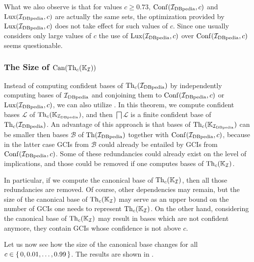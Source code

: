 What we also observe is that for values $c \geq 0.73$, $\operatorname{Conf}({\mathcal{I}_{\text{DBpedia}}}, c)$ and
$\operatorname{Lux}({\mathcal{I}_{\text{DBpedia}}}, c)$ are actually the same sets, \ie the optimization provided by
$\operatorname{Lux}({\mathcal{I}_{\text{DBpedia}}}, c)$ does not take effect for such values of $c$.  Since one usually
considers only large values of $c$ the use of $\operatorname{Lux}({\mathcal{I}_{\text{DBpedia}}}, c)$ over $\operatorname{Conf}({\mathcal{I}_{\text{DBpedia}}},
c)$ seems questionable.

\subsubsection{The Size of $\operatorname{Can}(\operatorname{Th}_c({\mathbb{K}}_{\mathcal{I}}))$}
\label{sec:size-canth_cc-k_math}

Instead of computing confident bases of $\operatorname{Th}_c({\mathcal{I}_{\text{DBpedia}}})$ by independently computing
bases of ${\mathcal{I}_{\text{DBpedia}}}$ and conjoining them to $\operatorname{Conf}({\mathcal{I}_{\text{DBpedia}}}, c)$ or $\operatorname{Lux}({\mathcal{I}_{\text{DBpedia}}}, c)$,
we can also utilize
.  In this theorem,
we compute confident bases $\mathcal{L}$ of $\operatorname{Th}_c({\mathbb{K}}_{{\mathcal{I}_{\text{DBpedia}}}})$, and then
$\bigsqcap \mathcal{L}$ is a finite confident base of $\operatorname{Th}_c({\mathcal{I}_{\text{DBpedia}}})$.  An advantage of
this approach is that bases of $\operatorname{Th}_c({\mathbb{K}}_{{\mathcal{I}_{\text{DBpedia}}}})$ can be smaller then bases
$\mathcal{B}$ of $\operatorname{Th}({\mathcal{I}_{\text{DBpedia}}})$ together with $\operatorname{Conf}({\mathcal{I}_{\text{DBpedia}}}, c)$, because in the
latter case GCIs from $\mathcal{B}$ could already be entailed by GCIs from
$\operatorname{Conf}({\mathcal{I}_{\text{DBpedia}}}, c)$.  Some of these redundancies could already exist on the level of
implications, and those could be removed if one computes bases of $\operatorname{Th}_c({\mathbb{K}}_{\mathcal{I}})$.

In particular, if we compute the canonical base of $\operatorname{Th}_c({\mathbb{K}}_{\mathcal{I}})$, then all
those redundancies are removed.  Of course, other dependencies may remain, but the size of
the canonical base of $\operatorname{Th}_c({\mathbb{K}}_{\mathcal{I}})$ may serve as an upper bound on the
number of GCIs one needs to represent $\operatorname{Th}_c({\mathbb{K}}_{\mathcal{I}})$.  On the other hand,
considering the canonical base of $\operatorname{Th}_c({\mathbb{K}}_{\mathcal{I}})$ may result in bases which
are not confident anymore, \ie they contain GCIs whose confidence is not above $c$.

Let us now see how the size of the canonical base changes for all $c \in {\ensuremath{\{\, 0, 0.01,
  \dots, 0.99 \,\}}}$.  The results are shown in .

